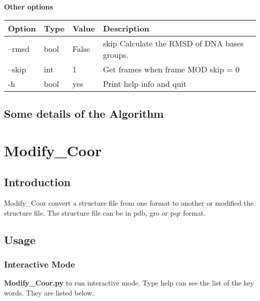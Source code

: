 \documentclass[letterpaper,10pt,english]{sphinxmanual}
\begin{document}
\textbf{Other options}

\begin{tabulary}{\linewidth}{|L|L|L|L|}
\hline
\textbf{
Option
} & \textbf{
Type
} & \textbf{
Value
} & \textbf{
Description
}\\
\hline

--rmsd
 & 
bool
 & 
False
 & 
skip Calculate the RMSD of DNA bases groups.
\\

--skip
 & 
int
 & 
1
 & 
Get frames when frame MOD skip = 0
\\

-h
 & 
bool
 & 
yes
 & 
Print help info and quit
\\
\hline
\end{tabulary}



\section{Some details of the Algorithm}
\label{documentation_pages/Parallel_analysis:some-details-of-the-algorithm}

\chapter{Modify\_Coor}
\label{documentation_pages/Modify_Coor::doc}\label{documentation_pages/Modify_Coor:modify-coor}

\section{Introduction}
\label{documentation_pages/Modify_Coor:introduction}
Modify\_Coor convert a structure file from one format to another or modified
the structure file. The structure file can be in pdb, gro or pqr format.


\section{Usage}
\label{documentation_pages/Modify_Coor:usage}

\subsection{Interactive Mode}
\label{documentation_pages/Modify_Coor:interactive-mode}
\textbf{Modify\_Coor.py} to run interactive mode.
Type help can see the list of the key words. They are listed below.
\end{document}
